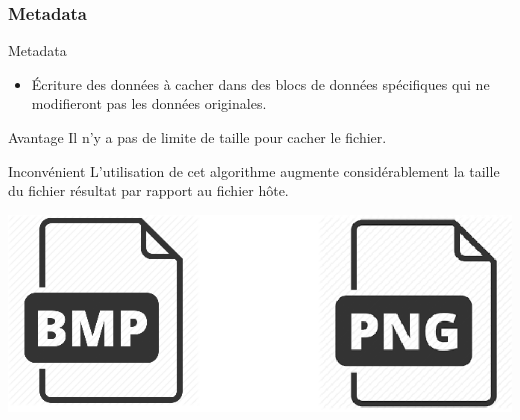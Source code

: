 \documentclass{beamer}
\begin{document}
	\subsubsection{Metadata}
    \begin{frame}
    
	\begin{block}{Metadata}
	\begin{itemize}
	[circle]
	\item Écriture des données à cacher dans des blocs de données spécifiques 
	qui ne modifieront pas les données originales. 
	\end{itemize}
	\end{block}
	
	\begin{exampleblock}{Avantage} 
	Il n'y a pas de limite de taille pour cacher le fichier. 
	\end{exampleblock}
	
	\begin{alertblock}{Inconvénient} 
	L'utilisation de cet algorithme augmente considérablement la taille du 
	fichier résultat par rapport au fichier hôte. 
	\end{alertblock}
	
	\hspace{3.5cm}
    \includegraphics[scale=0.2]{pictures/meta.png}
    
    \end{frame}
    
\end{document}
